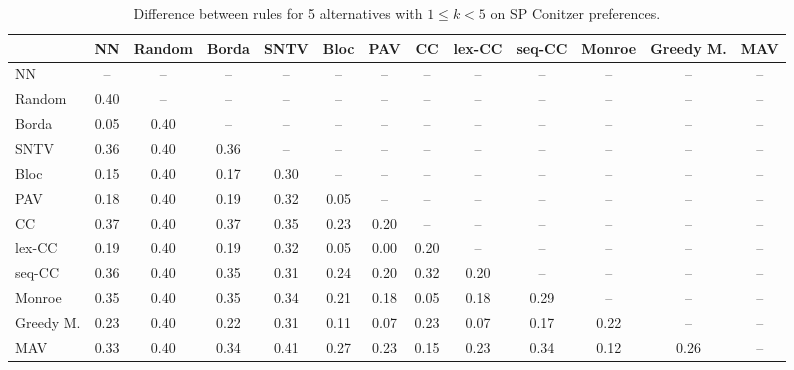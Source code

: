 
\begin{table*}[h!]
\centering
\begin{tabular}{lcccccccccccc}
\toprule
 & NN & Random & Borda & SNTV & Bloc & PAV & CC & lex-CC & seq-CC & Monroe & Greedy M. & MAV \\
\midrule
NN & -- & -- & -- & -- & -- & -- & -- & -- & -- & -- & -- & -- \\
Random & 0.40 & -- & -- & -- & -- & -- & -- & -- & -- & -- & -- & -- \\
Borda & 0.05 & 0.40 & -- & -- & -- & -- & -- & -- & -- & -- & -- & -- \\
SNTV & 0.36 & 0.40 & 0.36 & -- & -- & -- & -- & -- & -- & -- & -- & -- \\
Bloc & 0.15 & 0.40 & 0.17 & 0.30 & -- & -- & -- & -- & -- & -- & -- & -- \\
PAV & 0.18 & 0.40 & 0.19 & 0.32 & 0.05 & -- & -- & -- & -- & -- & -- & -- \\
CC & 0.37 & 0.40 & 0.37 & 0.35 & 0.23 & 0.20 & -- & -- & -- & -- & -- & -- \\
lex-CC & 0.19 & 0.40 & 0.19 & 0.32 & 0.05 & 0.00 & 0.20 & -- & -- & -- & -- & -- \\
seq-CC & 0.36 & 0.40 & 0.35 & 0.31 & 0.24 & 0.20 & 0.32 & 0.20 & -- & -- & -- & -- \\
Monroe & 0.35 & 0.40 & 0.35 & 0.34 & 0.21 & 0.18 & 0.05 & 0.18 & 0.29 & -- & -- & -- \\
Greedy M. & 0.23 & 0.40 & 0.22 & 0.31 & 0.11 & 0.07 & 0.23 & 0.07 & 0.17 & 0.22 & -- & -- \\
MAV & 0.33 & 0.40 & 0.34 & 0.41 & 0.27 & 0.23 & 0.15 & 0.23 & 0.34 & 0.12 & 0.26 & -- \\
\bottomrule
\end{tabular}

\caption{Difference between rules for 5 alternatives with $1 \leq k < 5$ on SP Conitzer preferences.}
\end{table*}

